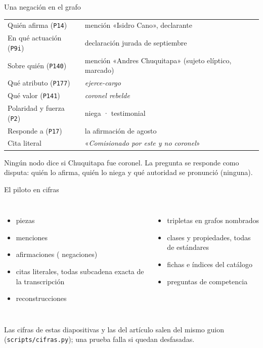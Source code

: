 \documentclass[aspectratio=169,11pt]{beamer}
\newcommand{\cita}[1]{«\textit{#1}»}
\newcommand{\ttt}[1]{\texttt{\small #1}}
\newcommand{\cifra}[1]{\textbf{\alert{#1}}}
\begin{document}
\begin{frame}{Una negación en el grafo}
\small
\begin{tabular}{@{}ll@{}}
\toprule
Quién afirma (\ttt{P14}) & mención «Isidro Cano», declarante \\
En qué actuación (\ttt{P9i}) & declaración jurada de septiembre \\
Sobre quién (\ttt{P140}) & mención «Andres Chuquitapa» (sujeto elíptico, marcado) \\
Qué atributo (\ttt{P177}) & \emph{ejerce-cargo} \\
Qué valor (\ttt{P141}) & \emph{coronel rebelde} \\
Polaridad y fuerza (\ttt{P2}) & \alert{niega} · testimonial \\
Responde a (\ttt{P17}) & la afirmación de agosto \\
Cita literal & \cita{Comisionado por este y no coronel} \\
\bottomrule
\end{tabular}

\medskip
Ningún nodo dice si Chuquitapa fue coronel. La pregunta se responde como \alert{disputa}: quién lo afirma, quién lo
niega y qué autoridad se pronunció (ninguna).
\end{frame}

\begin{frame}{El piloto en cifras}
\begin{columns}[T]
\begin{itemize}
\item \cifra{\cifraPiezas} piezas
\item \cifra{\cifraMenciones} menciones
\item \cifra{\cifraAfirmaciones} afirmaciones (\cifra{\cifraNegaciones} negaciones)
\item \cifra{\cifraCitas} citas literales, todas subcadena exacta de la transcripción
\item \cifra{\cifraReconstruccionesConFechas} reconstrucciones
\end{itemize}
\begin{itemize}
\item \cifra{\cifraTripletas} tripletas en \cifra{\cifraGrafos} grafos nombrados
\item \cifra{\cifraClases} clases y \cifra{\cifraPropiedades} propiedades, todas de estándares
\item \cifra{\cifraCatalogoRegistros} fichas e índices del catálogo
\item \cifra{\cifraPreguntas} preguntas de competencia
\end{itemize}
\end{columns}
\medskip
\footnotesize Las cifras de estas diapositivas y las del artículo salen del mismo guion (\ttt{scripts/cifras.py});
una prueba falla si quedan desfasadas.
\end{frame}
\end{document}
